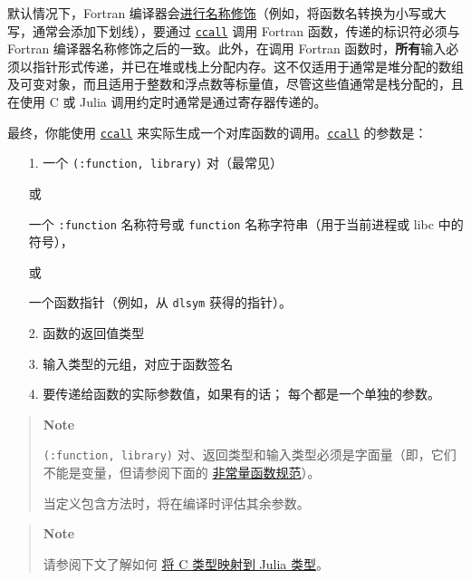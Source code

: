 默认情况下，Fortran 编译器会\href{https://en.wikipedia.org/wiki/Name\_mangling\#Fortran}{进行名称修饰}（例如，将函数名转换为小写或大写，通常会添加下划线），要通过 \hyperlink{14245046751182637566}{\texttt{ccall}} 调用 Fortran 函数，传递的标识符必须与 Fortran 编译器名称修饰之后的一致。此外，在调用 Fortran 函数时，\textbf{所有}输入必须以指针形式传递，并已在堆或栈上分配内存。这不仅适用于通常是堆分配的数组及可变对象，而且适用于整数和浮点数等标量值，尽管这些值通常是栈分配的，且在使用 C 或 Julia 调用约定时通常是通过寄存器传递的。



最终，你能使用 \hyperlink{14245046751182637566}{\texttt{ccall}} 来实际生成一个对库函数的调用。\hyperlink{14245046751182637566}{\texttt{ccall}} 的参数是：



\begin{itemize}
\item[1. ] 一个 \texttt{(:function, {\textquotedbl}library{\textquotedbl})} 对（最常见）

或

一个 \texttt{:function} 名称符号或 \texttt{{\textquotedbl}function{\textquotedbl}} 名称字符串（用于当前进程或 libc 中的符号），

或

一个函数指针（例如，从 \texttt{dlsym} 获得的指针）。


\item[2. ] 函数的返回值类型


\item[3. ] 输入类型的元组，对应于函数签名


\item[4. ] 要传递给函数的实际参数值，如果有的话； 每个都是一个单独的参数。

\end{itemize}


\begin{quote}
\textbf{Note}

\texttt{(:function, {\textquotedbl}library{\textquotedbl})} 对、返回类型和输入类型必须是字面量（即，它们不能是变量，但请参阅下面的 \hyperlink{415091760485310867}{非常量函数规范}）。

当定义包含方法时，将在编译时评估其余参数。

\end{quote}


\begin{quote}
\textbf{Note}

请参阅下文了解如何 \hyperlink{10872711251657367863}{将 C 类型映射到 Julia 类型}。

\end{quote}


